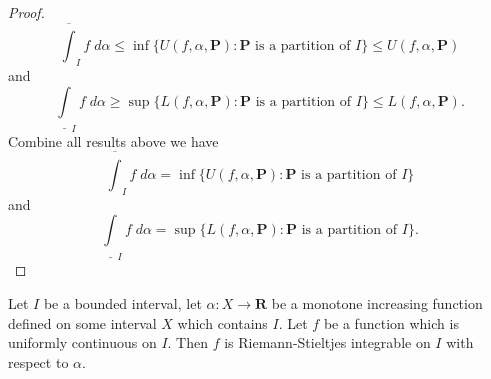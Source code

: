 \begin{proof}
    \[
        \overline{\int}_I f \; d \alpha \leq \inf\big\{U(f, \alpha, \mathbf{P}) : \mathbf{P} \text{ is a partition of } I\big\} \leq U(f, \alpha, \mathbf{P})
    \]
    and
    \[
        \underline{\int}_I f \; d \alpha \geq \sup\big\{L(f, \alpha, \mathbf{P}) : \mathbf{P} \text{ is a partition of } I\big\} \leq L(f, \alpha, \mathbf{P}).
    \]
    Combine all results above we have
    \[
        \overline{\int}_I f \; d \alpha = \inf\big\{U(f, \alpha, \mathbf{P}) : \mathbf{P} \text{ is a partition of } I\big\}
    \]
    and
    \[
        \underline{\int}_I f \; d \alpha = \sup\big\{L(f, \alpha, \mathbf{P}) : \mathbf{P} \text{ is a partition of } I\big\}.
    \]
\end{proof}

\begin{additional corollary}\label{ac 11.8.15}
Let \(I\) be a bounded interval, let \(\alpha : X \to \mathbf{R}\) be a monotone increasing function defined on some interval \(X\) which contains \(I\).
Let \(f\) be a function which is uniformly continuous on \(I\).
Then \(f\) is Riemann-Stieltjes integrable on \(I\) with respect to \(\alpha\).
\end{additional corollary}

